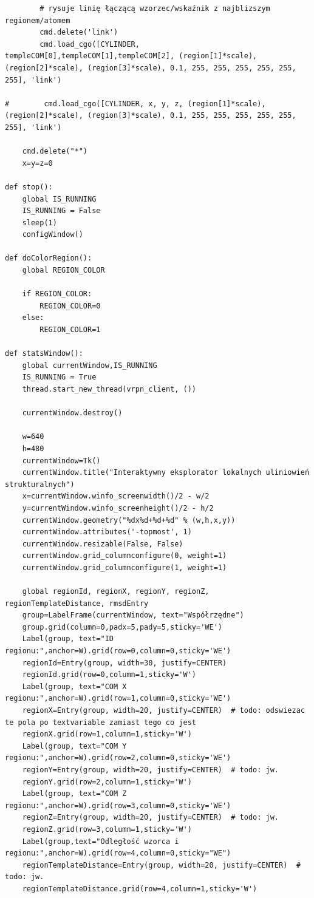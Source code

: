 \documentclass[licencjacka]{pracamgr}
\begin{document}
\begin{lstlisting}
        # rysuje linię łączącą wzorzec/wskaźnik z najblizszym regionem/atomem
        cmd.delete('link')
        cmd.load_cgo([CYLINDER, templeCOM[0],templeCOM[1],templeCOM[2], (region[1]*scale), (region[2]*scale), (region[3]*scale), 0.1, 255, 255, 255, 255, 255, 255], 'link')
         
#        cmd.load_cgo([CYLINDER, x, y, z, (region[1]*scale), (region[2]*scale), (region[3]*scale), 0.1, 255, 255, 255, 255, 255, 255], 'link')
            
    cmd.delete("*")
    x=y=z=0
    
def stop():
    global IS_RUNNING
    IS_RUNNING = False
    sleep(1)
    configWindow()
    
def doColorRegion():
    global REGION_COLOR
    
    if REGION_COLOR:
        REGION_COLOR=0
    else:
        REGION_COLOR=1
    
def statsWindow():    
    global currentWindow,IS_RUNNING
    IS_RUNNING = True
    thread.start_new_thread(vrpn_client, ())
    
    currentWindow.destroy()
    
    w=640
    h=480
    currentWindow=Tk()
    currentWindow.title("Interaktywny eksplorator lokalnych uliniowień strukturalnych")
    x=currentWindow.winfo_screenwidth()/2 - w/2
    y=currentWindow.winfo_screenheight()/2 - h/2
    currentWindow.geometry("%dx%d+%d+%d" % (w,h,x,y))
    currentWindow.attributes('-topmost', 1)
    currentWindow.resizable(False, False)
    currentWindow.grid_columnconfigure(0, weight=1)
    currentWindow.grid_columnconfigure(1, weight=1)
    
    global regionId, regionX, regionY, regionZ, regionTemplateDistance, rmsdEntry
    group=LabelFrame(currentWindow, text="Współrzędne")
    group.grid(column=0,padx=5,pady=5,sticky='WE')
    Label(group, text="ID regionu:",anchor=W).grid(row=0,column=0,sticky='WE')
    regionId=Entry(group, width=30, justify=CENTER)
    regionId.grid(row=0,column=1,sticky='W')
    Label(group, text="COM X regionu:",anchor=W).grid(row=1,column=0,sticky='WE')
    regionX=Entry(group, width=20, justify=CENTER)  # todo: odswiezac te pola po textvariable zamiast tego co jest
    regionX.grid(row=1,column=1,sticky='W')
    Label(group, text="COM Y regionu:",anchor=W).grid(row=2,column=0,sticky='WE')
    regionY=Entry(group, width=20, justify=CENTER)  # todo: jw.
    regionY.grid(row=2,column=1,sticky='W')
    Label(group, text="COM Z regionu:",anchor=W).grid(row=3,column=0,sticky='WE')
    regionZ=Entry(group, width=20, justify=CENTER)  # todo: jw.
    regionZ.grid(row=3,column=1,sticky='W')
    Label(group,text="Odległość wzorca i regionu:",anchor=W).grid(row=4,column=0,sticky="WE")
    regionTemplateDistance=Entry(group, width=20, justify=CENTER)  # todo: jw.
    regionTemplateDistance.grid(row=4,column=1,sticky='W')
    

\end{lstlisting}
\end{document}
